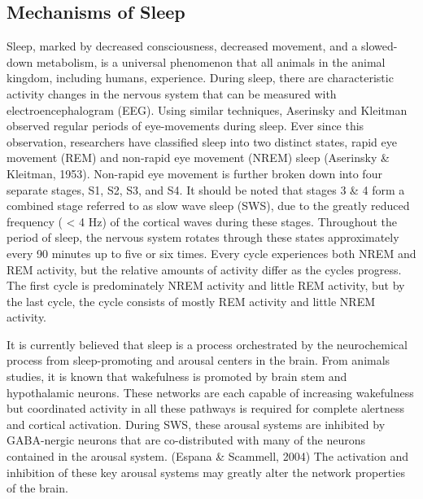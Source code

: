 \documentclass[11pt,letterpaper,doublespacing,titlepage]{article}
\begin{document}
\subsection{Mechanisms of Sleep}
\par
Sleep, marked by decreased consciousness, decreased movement, and a slowed-down metabolism, is a universal phenomenon that all animals in the animal kingdom, including humans, experience. During sleep, there are characteristic activity changes in the nervous system that can be measured with electroencephalogram (EEG). Using similar techniques, Aserinsky and Kleitman observed regular periods of eye-movements during sleep. Ever since this observation, researchers have classified sleep into two distinct states, rapid eye movement (REM) and non-rapid eye movement (NREM) sleep (Aserinsky \& Kleitman, 1953). Non-rapid eye movement is further broken down into four separate stages, S1, S2, S3, and S4. It should be noted that stages 3  \& 4 form a combined stage referred to as slow wave sleep (SWS), due to the greatly reduced frequency ( < 4 Hz) of the cortical waves during these stages. Throughout the period of sleep, the nervous system rotates through these states approximately every 90 minutes up to five or six times. Every cycle experiences both NREM and REM activity, but the relative amounts of activity differ as the cycles progress. The first cycle is predominately NREM activity and little REM activity, but by the last cycle, the cycle consists of mostly REM activity and little NREM activity.
\par
It is currently believed that sleep is a process orchestrated by the neurochemical process from sleep-promoting and arousal centers in the brain. From animals studies, it is known that wakefulness is promoted by brain stem and hypothalamic neurons. These networks are each capable of increasing wakefulness but coordinated activity in all these pathways is required for complete alertness and cortical activation. During SWS, these arousal systems are inhibited by GABA-nergic neurons that are co-distributed with many of the neurons contained in the arousal system. (Espana \& Scammell, 2004) The activation and inhibition of these key arousal systems may greatly alter the network properties of the brain.
\end{document}
